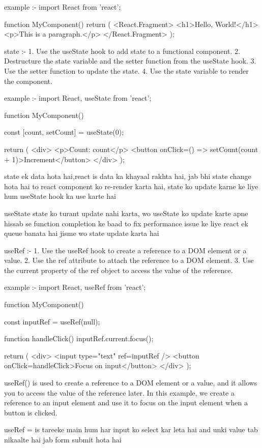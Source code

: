 example :-
import React from 'react';

function MyComponent() {
  return (
    <React.Fragment>
      <h1>Hello, World!</h1>
      <p>This is a paragraph.</p>
    </React.Fragment>
  );
}

state :-
1. Use the useState hook to add state to a functional component.
2. Destructure the state variable and the setter function from the useState hook.
3. Use the setter function to update the state.
4. Use the state variable to render the component.

example :-
import React, { useState } from 'react';

function MyComponent() {
  const [count, setCount] = useState(0);

  return (
    <div>
      <p>Count: {count}</p>
      <button onClick={() => setCount(count + 1)}>Increment</button>
    </div>
  );
}

state ek data hota hai,react is data ka khayaal rakhta hai, jab bhi state change hota hai to react component ko re-render karta hai, state ko update karne ke liye hum useState hook ka use karte hai 

useState state ko turant update nahi karta, wo useState ko update karte apne hissab se function completion ke baad to fix performance issue ke liye react ek queue banata hai jisme wo state update karta hai

useRef :- 
1. Use the useRef hook to create a reference to a DOM element or a value. 
2. Use the ref attribute to attach the reference to a DOM element.
3. Use the current property of the ref object to access the value of the reference.

example :-
import React, { useRef } from 'react';

function MyComponent() {
  const inputRef = useRef(null);

  function handleClick() {
    inputRef.current.focus();
  }
  
  return (
    <div>
      <input type="text" ref={inputRef} />
      <button onClick={handleClick}>Focus on input</button>
    </div>
  );
  }
  useRef() is used to create a reference to a DOM element or a value, and it allows you to access the value of the reference later. In this example, we create a reference to an input element and use it to focus on the input element when a button is clicked.

  useRef = is tareeke main hum har input ko select kar leta hai and unki value tab nikaalte hai jab form submit hota hai 

